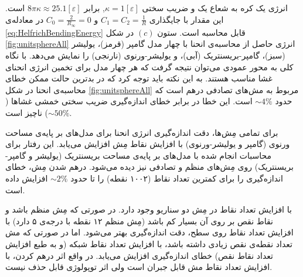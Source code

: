 
انرژی یک کره‌ به شعاع یک و ضریب سختی 
$\kappa=1[\varepsilon]$,
برابر 
$8\pi\kappa\approx 25.1[\varepsilon]$
است. این مقدار با جایگذاری 
$C_1=C_2=\frac{1}{R}$
و
$C_0=\frac{2}{R_\infty}=0$
در معادله‌ی 
\ref{eq:HelfrichBendingEnergy}
قابل محاسبه‌ است. ستون 
$(c)$
 در شکل 
\ref{fig:unitsphereAll}
انرژی حاصل از محاسبه‌ی انحنا با چهار مدل گامپر (قرمز)، یولیشر (سبز)، گامپر-بریسنتریک (آبی)، و یولیشر-ورنوی (نارنجی) را نمایش می‌دهد. با نگاه کلی به محور عمودی می‌توان نتیجه گرفت که هر چهار مدل برای تخمین انرژی انحنای غشا مناسب هستند. به این نکته باید توجه کرد که در بدترین حالت ممکن خطای محاسبه‌ی انحنا در شکل 
\ref{fig:unitsphereAll}
مربوط به مش‌های تصادفی درهم است که حدود
$\sim4\%$
است. این خطا در برابر خطای اندازه‌گیری ضریب سختی خمشی غشا‌ها 
($\sim50\%$)
 ناچیز است.

برای تمامی مِش‌ها، دقت اندازه‌گیری انرژی انحنا برای مدل‌های بر پایه‌ی مساحت ورنوی (گامپر و یولیشر-ورنوی) با افزایش نقاط مِش افزایش می‌یابد. این رفتار برای محاسبات انجام شده با مدل‌های بر پایه‌ی مساحت بریسنتریک (یولیشر و گامپر-بریسنتریک) روی مِش‌های منظم و تصادفی نیز دیده می‌شود. درهم شدن مِش، خطای اندازه‌‌گیری را برای کمترین تعداد نقاط (۱۰۰۲ نقطه) را تا حدود 
$\sim2\%$
افزایش داده است. 

با افزایش تعداد نقاط در مِش دو سناریو وجود دارد. در صورتی که مِش‌ منظم باشد و نقاط نقص بر روی آن بسیار کم باشد (مِش منظم ۱۲ نقطه با درجه‌ی ۵ دارد) با افزایش تعداد نقاط روی سطح، دقت اندازه‌گیری بهتر می‌شود. اما در صورتی که مش تعداد نقطه‌ی نقص زیادی داشته باشد، با افزایش تعداد نقاط شبکه (و به طبع افزایش تعداد نقاط نقص) خطای اندازه‌گیری افزایش می‌یابد. در واقع اثر درهم کردن، با افزایش تعداد نقاط مش قابل جبران است ولی اثر توپولوژی قابل حذف نیست.



